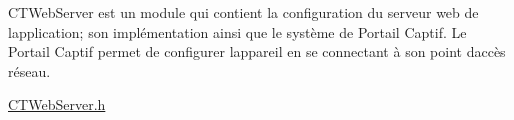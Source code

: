 CTWeb\+Server est un module qui contient la configuration du serveur web de l\textquotesingle{}application; son implémentation ainsi que le système de Portail Captif. Le Portail Captif permet de configurer l\textquotesingle{}appareil en se connectant à son point d\textquotesingle{}accès réseau.

\mbox{\hyperlink{_c_t_web_server_8h}{CTWeb\+Server.\+h}} 